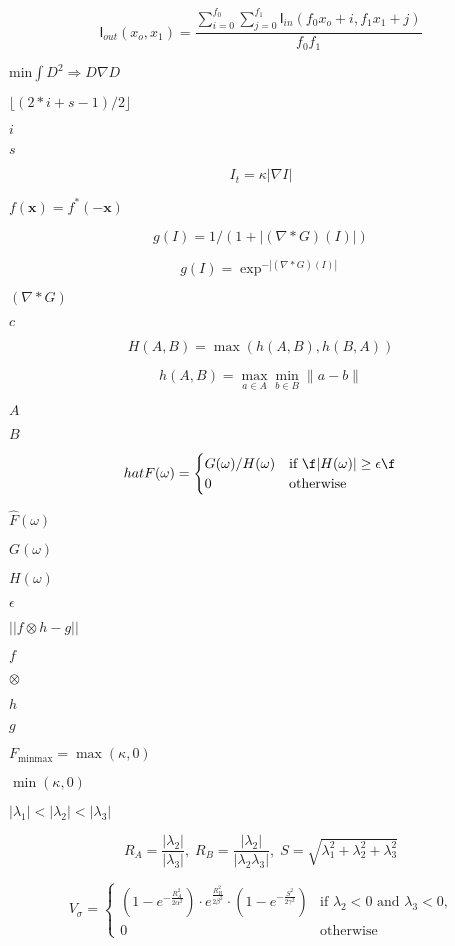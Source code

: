 \documentclass{article}
\begin{document}
\[ \mathsf{I}_{out}(x_o,x_1) = \frac{\sum_{i=0}^{f_0}\sum_{j=0}^{f_1}\mathsf{I}_{in}(f_0 x_o+i,f_1 x_1+j)}{f_0 f_1} \]
\pagebreak

$ \mbox{min} \int D^2 \Rightarrow D \nabla D $
\pagebreak

$ \lfloor (2*i+s-1)/2 \rfloor $
\pagebreak

$i$
\pagebreak

$s$
\pagebreak

\[ I_t = \kappa |\nabla I| \]
\pagebreak

$ f(\mathbf{x}) = f^*(-\mathbf{x}) $
\pagebreak

\[ g(I) = 1 / ( 1 + | (\nabla * G)(I)| ) \]
\pagebreak

\[ g(I) = \exp^{-|(\nabla * G)(I)|} \]
\pagebreak

$ (\nabla * G) $
\pagebreak

$ c $
\pagebreak

\[ H(A,B) = \max(h(A,B),h(B,A)) \]
\pagebreak

\[ h(A,B) = \max_{a \in A} \min_{b \in B} \| a - b\| \]
\pagebreak

$A$
\pagebreak

$B$
\pagebreak

\[ hat{F}(\omega) = \begin{cases} G(\omega) / H(\omega) & \text{if \f$|H(\omega)| \geq \epsilon\f$} \\ 0 & \text{otherwise} \end{cases} \]
\pagebreak

$\hat{F}(\omega)$
\pagebreak

$G(\omega)$
\pagebreak

$H(\omega)$
\pagebreak

$\epsilon$
\pagebreak

$||f \otimes h - g||$
\pagebreak

$f$
\pagebreak

$\otimes$
\pagebreak

$h$
\pagebreak

$g$
\pagebreak

$ F_{\mbox{minmax}} = \max(\kappa,0) $
\pagebreak

$ \min(\kappa,0) $
\pagebreak

$ | \lambda_1 | < | \lambda_2 | < |\lambda_3 | $
\pagebreak

\[ R_A = \frac{|\lambda_2|}{|\lambda_3|}, \; R_B = \frac{|\lambda_2|}{|\lambda_2\lambda_3|}, \; S = \sqrt{\lambda_1^2+\lambda_2^2+\lambda_3^2} \]
\pagebreak

\[ V_{\sigma}= \begin{cases} (1-e^{-\frac{R_A^2}{2\alpha^2}}) \cdot e^{\frac{R_B^2}{2\beta^2}} \cdot (1-e^{-\frac{S^2}{2\gamma^2}}) & \text{if } \lambda_2<0 \text{ and } \lambda_3<0 \text{,}\\ 0 & \text{otherwise} \end{cases} \]
\pagebreak
\end{document}
